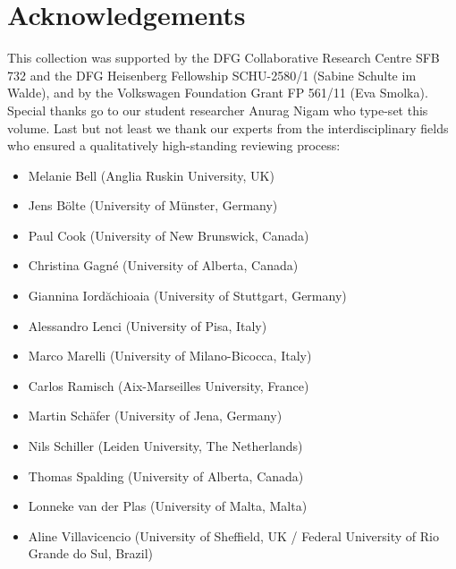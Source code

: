 \documentclass[output=paper]{langsci/langscibook}
\begin{document}
\section*{Acknowledgements}

This collection was supported by the DFG Collaborative Research Centre
SFB 732 and the DFG Heisenberg Fellowship SCHU-2580/1 (Sabine Schulte
im Walde), and by the Volkswagen Foundation Grant FP 561/11 (Eva
Smolka). Special thanks go to our student researcher Anurag Nigam who
type-set this volume.
%
Last but not least we thank our experts from the interdisciplinary
fields who ensured a qualitatively high-standing reviewing process:
\begin{itemize}
\item Melanie Bell (Anglia Ruskin University, UK)
\item Jens Bölte (University of Münster, Germany)
\item Paul Cook (University of New Brunswick, Canada)
\item Christina Gagné (University of Alberta, Canada)
\item Giannina Iord\u{a}chioaia (University of Stuttgart, Germany)
\item Alessandro Lenci (University of Pisa, Italy)
\item Marco Marelli (University of Milano-Bicocca, Italy)
\item Carlos Ramisch (Aix-Marseilles University, France)
\item Martin Schäfer (University of Jena, Germany)
\item Nils Schiller (Leiden University, The Netherlands)
\item Thomas Spalding (University of Alberta, Canada)
\item Lonneke van der Plas (University of Malta, Malta)
\item Aline Villavicencio (University of Sheffield, UK / Federal University of Rio Grande do Sul, Brazil)
\end{itemize}

{\sloppy\printbibliography[heading=subbibliography,notkeyword=this]}
\end{document}
